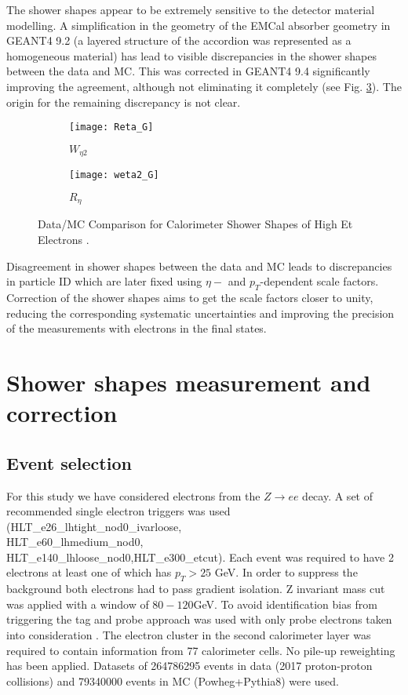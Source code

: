    The shower shapes appear to be extremely sensitive to the detector material modelling. A simplification in the geometry of the EMCal absorber geometry in GEANT4 9.2 (a layered structure of the accordion was represented as a homogeneous material) has lead to visible discrepancies in the shower shapes between the data and MC. This was corrected in GEANT4 9.4 significantly improving the agreement, although not eliminating it completely (see Fig. \ref{fig::sshapes_geant}).  The origin for the remaining discrepancy is not clear.\\
      	\begin{figure}[htbp]
  	\begin{subfigure}[t]{0.4\textwidth}
  		\texttt{[image: Reta\_G]}
  		\caption[ $W_{\eta 2}$]{$W_{\eta 2}$}
  		\label{fig::weta2_geant}
  	\end{subfigure}
  	\hfill
  	\begin{subfigure}[t]{0.4\textwidth} 
  		\texttt{[image: weta2\_G]}
  		\caption[ $R_{\eta}$]{$R_{\eta}$ }
  		\label{fig::reta_geant}
  	\end{subfigure}
  	\caption{Data/MC Comparison for Calorimeter Shower Shapes of High Et Electrons \cite{geant_corr}.}
  	\label{fig::sshapes_geant}
  \end{figure}
  
  Disagreement in shower shapes between the data and MC leads to discrepancies in particle ID which are later fixed using $\eta-$ and $p_T$-dependent scale factors. Correction of the shower shapes aims to get the scale factors closer to unity, reducing the corresponding systematic uncertainties and improving the precision of the measurements with electrons in the final states.  

  
  \section{ Shower shapes measurement and correction  }
  \subsection{Event selection}
  For this study we have considered electrons from the $Z\rightarrow ee$ decay. A set of recommended single electron triggers was used (HLT\_e26\_lhtight\_nod0\_ivarloose,\\ HLT\_e60\_lhmedium\_nod0,\\
   HLT\_e140\_lhloose\_nod0,HLT\_e300\_etcut). Each event was required to have 2 electrons at least one of which has $p_T>25$ GeV.  In order to suppress the background both electrons had to pass gradient isolation. Z invariant mass cut was applied with a window of $80-120$GeV. To avoid identification bias from triggering the tag and probe approach was used with only probe electrons taken into consideration \cite{RecoID2011}. The electron cluster in the second calorimeter layer was required to contain information from 77 calorimeter cells. No pile-up reweighting has been applied. Datasets of 264786295 events in data (2017 proton-proton collisions) and 79340000 events in MC (Powheg+Pythia8) were used. 
